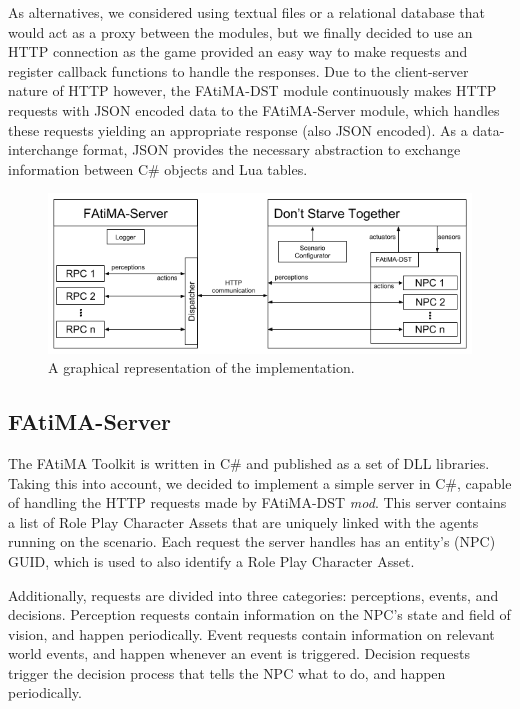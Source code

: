 As alternatives, we considered using textual files or a relational database that would act as a proxy between the modules, but we finally decided to use an \ac{HTTP} connection as the game provided an easy way to make requests and register callback functions to handle the responses.
Due to the client-server nature of \ac{HTTP} however, the FAtiMA-DST module continuously makes \ac{HTTP} requests with \ac{JSON} encoded data to the FAtiMA-Server module, which handles these requests yielding an appropriate response (also \ac{JSON} encoded).
As a data-interchange format, \ac{JSON} provides the necessary abstraction to exchange information between C\# objects and Lua tables.

\begin{figure}
  \centering
  \includegraphics[width=\textwidth]{./Images/implementation}
  \caption{A graphical representation of the implementation.}
  \label{fig:implementation}
\end{figure}

\subsection{FAtiMA-Server}

\noindent The FAtiMA Toolkit is written in C\# and published as a set of DLL libraries.
Taking this into account, we decided to implement a simple server in C\#, capable of handling the \ac{HTTP} requests made by FAtiMA-DST \textit{mod}.
This server contains a list of Role Play Character Assets that are uniquely linked with the agents running on the scenario.
Each request the server handles has an entity's (\ac{NPC}) \ac{GUID}, which is used to also identify a Role Play Character Asset.

Additionally, requests are divided into three categories: perceptions, events, and decisions.
Perception requests contain information on the \ac{NPC}'s state and field of vision, and happen periodically.
Event requests contain information on relevant world events, and happen whenever an event is triggered.
Decision requests trigger the decision process that tells the \ac{NPC} what to do, and happen periodically.

